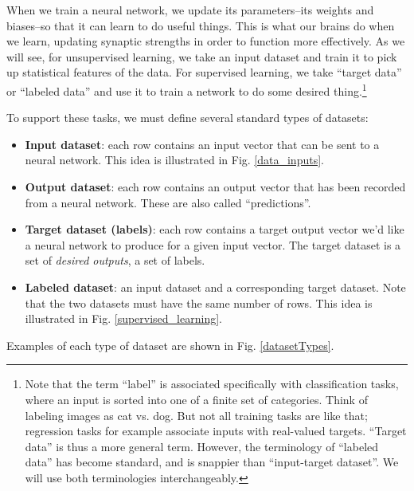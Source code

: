When we train a neural network, we update its parameters--its weights and biases--so that it can learn to do useful things. This is what our brains do when we learn, updating synaptic strengths in order to function more effectively. As we will see, for unsupervised learning, we take an input dataset and train it to pick up statistical features of the data. For supervised learning, we take ``target data'' or ``labeled data'' and use it to train a network to do some desired thing.\footnote{Note that the term ``label'' is associated specifically with classification tasks, where an input is sorted into one of a finite set of categories. Think of labeling images as cat vs. dog. But not all training tasks are like that; regression tasks for example associate inputs with real-valued targets. ``Target data''  is thus a more general term. However, the terminology of ``labeled data''  has become standard, and  is snappier than ``input-target dataset''. We will use both terminologies interchangeably.}

To support these tasks, we must define several standard types of datasets:
\begin{itemize}
\item \textbf{Input dataset}: each row contains an input vector that can be sent to a neural network. This idea is illustrated in Fig. \ref{data_inputs}.
\item \textbf{Output dataset}: each row contains an output vector that has been recorded from a neural network. These are also called ``predictions''. 
\item \textbf{Target dataset (labels)}: each row contains a target output vector we'd like a neural network to produce for a given input vector. The target dataset is a set of \emph{desired outputs}, a set of labels.
\item \textbf{Labeled dataset}: an input dataset and a corresponding target dataset. Note that the two datasets must have the same number of rows. This idea is illustrated in Fig. \ref{supervised_learning}.
\end{itemize}
Examples of each type of dataset are shown in Fig. \ref{datasetTypes}.


